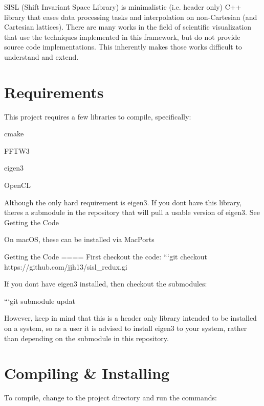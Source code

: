 S\+I\+SL (Shift Invariant Space Library) is minimalistic (i.\+e. header only) C++ library that eases data processing tasks and interpolation on non-\/\+Cartesian (and Cartesian lattices). There are many works in the field of scientific visualization that use the techniques implemented in this framework, but do not provide source code implementations. This inherently makes those works difficult to understand and extend.

\section*{Requirements }

This project requires a few libraries to compile, specifically\+:
\begin{DoxyItemize}
\item {\ttfamily cmake}
\item {\ttfamily F\+F\+T\+W3}
\item {\ttfamily eigen3}
\item {\ttfamily Open\+CL}
\end{DoxyItemize}

Although the only hard requirement is eigen3. If you don\textquotesingle{}t have this library, there\textquotesingle{}s a submodule in the repository that will pull a usable version of eigen3. See Getting the Code

On mac\+OS, these can be installed via Mac\+Ports 
\begin{DoxyCode}
Getting the Code
====
First checkout the code:
```git checkout https://github.com/jjh13/sisl\_redux.gi
\end{DoxyCode}


If you don\textquotesingle{}t have eigen3 installed, then checkout the submodules\+: 
\begin{DoxyCode}
```git submodule updat
\end{DoxyCode}


However, keep in mind that this is a header only library intended to be installed on a system, so as a user it is advised to install eigen3 to your system, rather than depending on the submodule in this repository.

\section*{Compiling \& Installing }

To compile, change to the project directory and run the commands\+:


